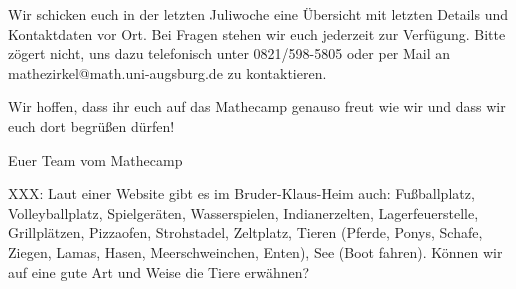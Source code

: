 \documentclass{zettel}
\begin{document}
Wir schicken euch in der letzten Juliwoche eine Übersicht mit
letzten Details und Kontaktdaten vor Ort. Bei Fragen stehen wir euch jederzeit
zur Verfügung. Bitte zögert nicht, uns dazu telefonisch unter 0821/598-5805 oder per
Mail an \textsf{mathezirkel@math.uni-augsburg.de} zu kontaktieren.

Wir hoffen, dass ihr euch auf das Mathecamp genauso freut wie wir und dass wir
euch dort begrüßen dürfen!

\vspace{2em}

Euer Team vom Mathecamp

\vfill

XXX: Laut einer Website gibt es im Bruder-Klaus-Heim auch:
Fußballplatz, Volleyballplatz, Spielgeräten, Wasserspielen, Indianerzelten,
Lagerfeuerstelle, Grillplätzen, Pizzaofen, Strohstadel, Zeltplatz, Tieren
(Pferde, Ponys, Schafe, Ziegen, Lamas, Hasen, Meerschweinchen, Enten), See
(Boot fahren). Können wir auf eine gute Art und Weise die Tiere erwähnen?

\end{document}
